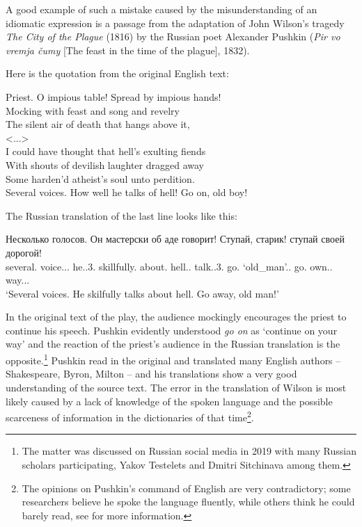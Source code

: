\documentclass[output=paper]{langscibook}
\begin{document}
A good example of such a mistake caused by the misunderstanding of an idiomatic expression is a passage from the adaptation of John Wilson’s tragedy \textit{The City of the Plague} (1816) by the Russian poet Alexander Pushkin (\textit{Pir vo vremja čumy} [The feast in the time of the plague], 1832).

Here is the quotation from the original English text:

\ea
Priest. O impious table! Spread by impious hands!\\
 Mocking with feast and song and revelry\\
 The silent air of death that hangs above it,\\
 <...>\\
 I could have thought that hell’s exulting fiends\\
 With shouts of devilish laughter dragged away\\
 Some harden’d atheist’s soul unto perdition.\\
 Several voices. How well he talks of hell! Go on, old boy!
 \z

The Russian translation of the last line looks like this:

\ea
\gll Несколько голосов. Он мастерски об аде говорит! Ступай, старик! ступай своей дорогой!\\
     several.{\PRON} voice.{\NOUN}.{\GEN}.{\PL} he.{\PRON}.3.{\NOM} skillfully.{\ADV} about.{\PREP} hell.{\NOUN}.{\LOC} talk.{\PRES}.3{\SG}. go.{\IMP} `old\_man'.{\NOUN}.{\NOM} go.{\IMP} own.{\PRON}.{\INSTR} way.{\NOUN}.{\INSTR}.{\SG}\\
\glt `Several voices. He skilfully talks about hell. Go away, old man!'

\z

In the original text of the play, the audience mockingly encourages the priest to continue his speech. Pushkin evidently understood \textit{go on} as ‘continue on your way’ and the reaction of the priest’s audience in the Russian translation is the opposite.\footnote{The matter was discussed on Russian social media in 2019 with many Russian scholars participating, Yakov Testelets and Dmitri Sitchinava among them.} Pushkin read in the original and translated many English authors – Shakespeare, Byron, Milton – and his translations show a very good understanding of the source text. The error in the translation of Wilson is most likely caused by a lack of knowledge of the spoken language and the possible scarceness of information in the dictionaries of that time\footnote{The opinions on Pushkin’s command of English are very contradictory; some researchers believe he spoke the language fluently, while others think he could barely read, see \citealt{Zaharov2008} for more information.}.
\end{document}
